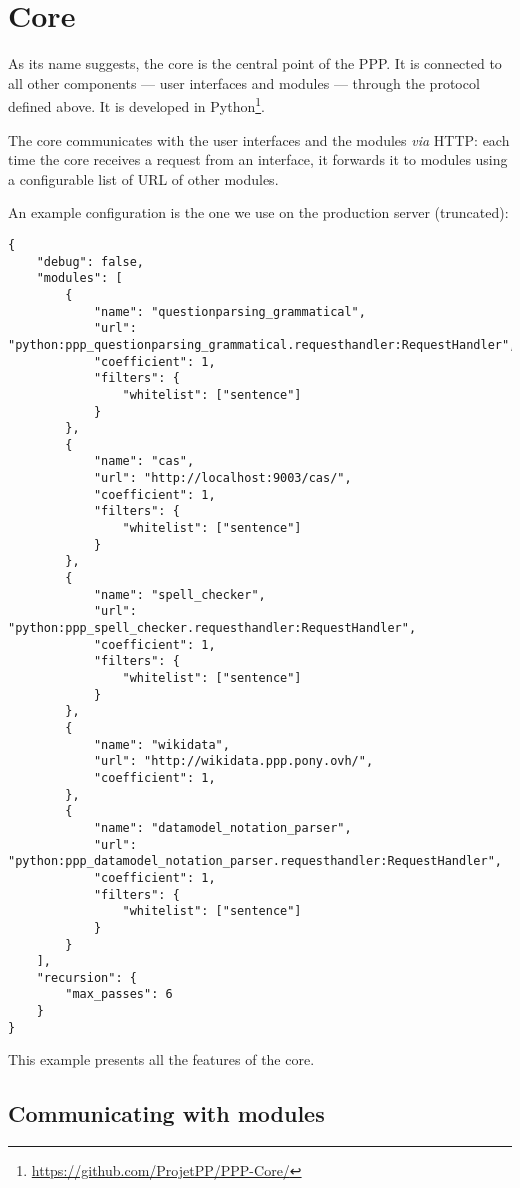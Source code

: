 \section{Core}

As its name suggests, the core is the central point of the PPP. It is
connected to all other components — user interfaces and modules — through
the protocol defined above. It is developed in Python\footnote{\url{https://github.com/ProjetPP/PPP-Core/}}.

The core communicates with the user interfaces and the modules {\em via} HTTP:
each time the core receives a request from an interface, it forwards it
to modules using a configurable list of URL of other modules.

An example configuration is the one we use on the production server
(truncated):

\begin{verbatim}
{
    "debug": false,
    "modules": [
        {
            "name": "questionparsing_grammatical",
            "url": "python:ppp_questionparsing_grammatical.requesthandler:RequestHandler",
            "coefficient": 1,
            "filters": {
                "whitelist": ["sentence"]
            }
        },
        {
            "name": "cas",
            "url": "http://localhost:9003/cas/",
            "coefficient": 1,
            "filters": {
                "whitelist": ["sentence"]
            }
        },
        {
            "name": "spell_checker",
            "url": "python:ppp_spell_checker.requesthandler:RequestHandler",
            "coefficient": 1,
            "filters": {
                "whitelist": ["sentence"]
            }
        },
        {
            "name": "wikidata",
            "url": "http://wikidata.ppp.pony.ovh/",
            "coefficient": 1,
        },
        {
            "name": "datamodel_notation_parser",
            "url": "python:ppp_datamodel_notation_parser.requesthandler:RequestHandler",
            "coefficient": 1,
            "filters": {
                "whitelist": ["sentence"]
            }
        }
    ],
    "recursion": {
        "max_passes": 6
    }
}
\end{verbatim}

This example presents all the features of the core.

\subsection{Communicating with modules}

